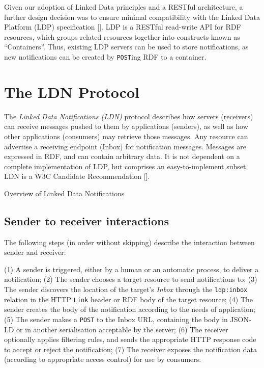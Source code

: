 \documentclass[a4paper]{llncs}
\begin{document}
\par Given our adoption of Linked Data principles and a RESTful architecture, a further design decision was to ensure minimal compatibility with the \empty Linked Data Platform (LDP) specification []. LDP is a RESTful read-write API for RDF resources, which groups related resources together into constructs known as ``Containers''. Thus, existing LDP servers can be used to store notifications, as new notifications can be created by {\tt POST}ing RDF to a container.




                        \section{The LDN Protocol}
  \label{protocol}



\par The {\em Linked Data Notifications (LDN)} protocol describes how servers (receivers) can receive messages pushed to them by applications (senders), as well as how other applications (consumers) may retrieve those messages. Any resource can advertise a receiving endpoint (Inbox) for notification messages. Messages are expressed in RDF, and can contain arbitrary data. It is not dependent on a complete implementation of LDP, but comprises an easy-to-implement subset. LDN is a \empty W3C Candidate Recommendation [].




                                Overview of Linked Data Notifications



                                \subsection{Sender to receiver interactions}
  \label{sender-to-receiver}



\par The following steps (in order without skipping) describe the interaction between sender and receiver:


\par (1) A sender is triggered, either by a human or an automatic process, to deliver a notification; (2) The sender chooses a target resource to send notifications to; (3) The sender discovers the location of the target’s {\em Inbox} through the {\tt ldp:inbox} relation in the HTTP {\tt Link} header or RDF body of the target resource; (4) The sender creates the body of the notification according to the needs of application; (5) The sender makes a {\tt POST} to the Inbox URL, containing the body in JSON-LD or in another serialisation acceptable by the server; (6) The receiver optionally applies filtering rules, and sends the appropriate HTTP response code to accept or reject the notification; (7) The receiver exposes the notification data (according to appropriate access control) for use by consumers.
\end{document}
